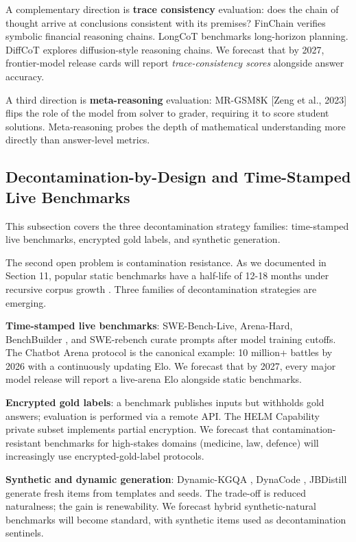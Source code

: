 \documentclass{article}
\begin{document}
A complementary direction is \textbf{trace consistency} evaluation: does the chain of thought arrive at conclusions consistent with its premises? FinChain \cite{xie20252025} verifies symbolic financial reasoning chains. LongCoT \cite{motwani20262026} benchmarks long-horizon planning. DiffCoT \cite{cao20262026} explores diffusion-style reasoning chains. We forecast that by 2027, frontier-model release cards will report \emph{trace-consistency scores} alongside answer accuracy.

A third direction is \textbf{meta-reasoning} evaluation: MR-GSM8K {[}Zeng et al., 2023{]} flips the role of the model from solver to grader, requiring it to score student solutions. Meta-reasoning probes the depth of mathematical understanding more directly than answer-level metrics.

\subsection{Decontamination-by-Design and Time-Stamped Live Benchmarks}\label{decontamination-by-design-and-time-stamped-live-benchmarks}

This subsection covers the three decontamination strategy families: time-stamped live benchmarks, encrypted gold labels, and synthetic generation.

The second open problem is contamination resistance. As we documented in Section 11, popular static benchmarks have a half-life of 12-18 months under recursive corpus growth \cite{white20242024}. Three families of decontamination strategies are emerging.

\textbf{Time-stamped live benchmarks}: SWE-Bench-Live, Arena-Hard, BenchBuilder \cite{li20242024}, and SWE-rebench \cite{badertdinov20252025} curate prompts after model training cutoffs. The Chatbot Arena protocol \cite{chiang20242024} is the canonical example: 10 million+ battles by 2026 with a continuously updating Elo. We forecast that by 2027, every major model release will report a live-arena Elo alongside static benchmarks.

\textbf{Encrypted gold labels}: a benchmark publishes inputs but withholds gold answers; evaluation is performed via a remote API. The HELM Capability private subset implements partial encryption. We forecast that contamination-resistant benchmarks for high-stakes domains (medicine, law, defence) will increasingly use encrypted-gold-label protocols.

\textbf{Synthetic and dynamic generation}: Dynamic-KGQA \cite{dammu2025dynamickgqaascalab}, DynaCode \cite{hu20252025}, JBDistill \cite{zhang20252025} generate fresh items from templates and seeds. The trade-off is reduced naturalness; the gain is renewability. We forecast hybrid synthetic-natural benchmarks will become standard, with synthetic items used as decontamination sentinels.
\end{document}
